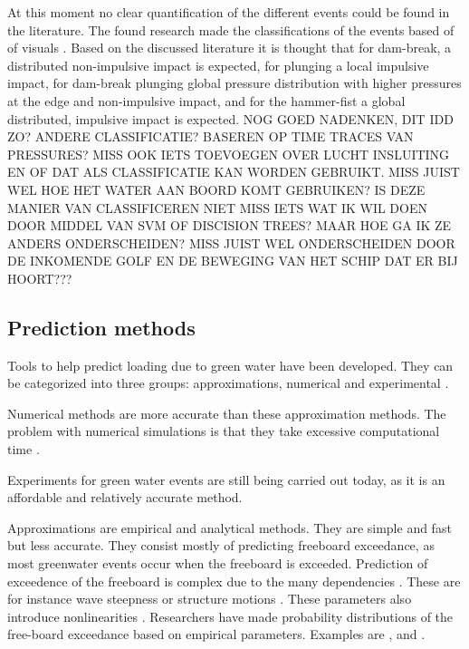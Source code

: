 \par 
At this moment no clear quantification of the different events could be found in the literature. The found research made the classifications of the events based of of visuals \cite{Greco2007, Chuang2019, Zhang2019}. Based on the discussed literature it is thought that for dam-break, a distributed non-impulsive impact is expected, for plunging a local impulsive impact, for dam-break plunging global pressure distribution with higher pressures at the edge and non-impulsive impact, and for the hammer-fist a global distributed, impulsive impact is expected. NOG GOED NADENKEN, DIT IDD ZO? ANDERE CLASSIFICATIE? BASEREN OP TIME TRACES VAN PRESSURES? MISS OOK IETS TOEVOEGEN OVER LUCHT INSLUITING EN OF DAT ALS CLASSIFICATIE KAN WORDEN GEBRUIKT. MISS JUIST WEL HOE HET WATER AAN BOORD KOMT GEBRUIKEN? IS DEZE MANIER VAN CLASSIFICEREN NIET MISS IETS WAT IK WIL DOEN DOOR MIDDEL VAN SVM OF DISCISION TREES? MAAR HOE GA IK ZE ANDERS ONDERSCHEIDEN? MISS JUIST WEL ONDERSCHEIDEN DOOR DE INKOMENDE GOLF EN DE BEWEGING VAN HET SCHIP DAT ER BIJ HOORT???

\subsection{Prediction methods}
Tools to help predict loading due to green water have been developed. They can be categorized into three groups: approximations, numerical and experimental \cite{ISSC2012}. 
\par 
Numerical methods are more accurate than these approximation methods. The problem with numerical simulations is that they take excessive computational time \cite{Soares2015}.  
\par 
Experiments for green water events are still being carried out today, as it is an affordable and relatively accurate method.
\par 
Approximations are empirical and analytical methods. They are simple and fast but less accurate. They consist mostly of predicting freeboard exceedance, as most greenwater events occur when the freeboard is exceeded. 
Prediction of exceedence of the freeboard is complex due to the many dependencies \cite{Lee2020}. These are for instance wave steepness or structure motions \cite{Greco2001,Buchner2002}. These parameters also introduce nonlinearities \cite{Faltinsen2002}. Researchers have made probability distributions of the free-board exceedance based on empirical parameters. Examples are \citet{Buchner2002}, \citet{Cox2001} and \citet{Soares2005}. 



